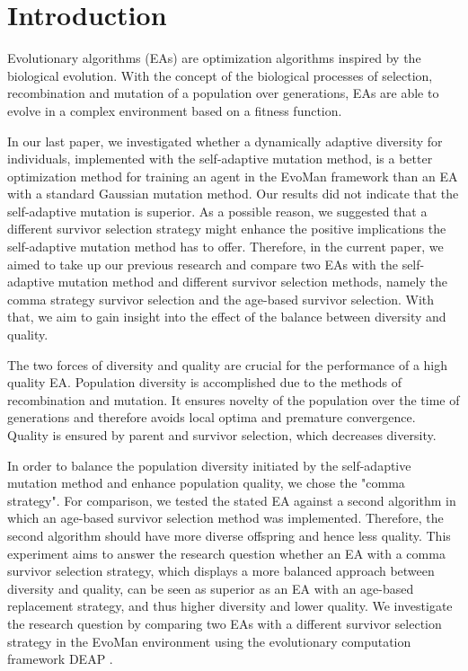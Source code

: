 \section{Introduction}

Evolutionary algorithms (EAs) are optimization algorithms inspired by the biological evolution. With the concept of the biological processes of selection, recombination and mutation of a population over generations, EAs are able to evolve in a complex environment based on a fitness function. 

In our last paper, we investigated whether a dynamically adaptive diversity for individuals, implemented with the self-adaptive mutation method, is a better optimization method for training an agent in the EvoMan framework \cite{defranca2020evoman} than an EA with a standard Gaussian mutation method. Our results did not indicate that the self-adaptive mutation is superior. As a possible reason, we suggested that a different survivor selection strategy might enhance the positive implications the self-adaptive mutation method has to offer. Therefore, in the current paper, we aimed to take up our previous research and compare two EAs with the self-adaptive mutation method and different survivor selection methods, namely the comma strategy survivor selection and the age-based survivor selection. With that, we aim to gain insight into the effect of the balance between diversity and quality.

The two forces of diversity and quality are crucial for the performance of a high quality EA. Population diversity is accomplished due to the methods of recombination and mutation. It ensures novelty of the population over the time of generations and therefore avoids local optima and premature convergence. Quality is ensured by parent and survivor selection, which decreases diversity. 

In order to balance the population diversity initiated by the self-adaptive mutation method and enhance population quality, we chose the "comma strategy"\cite{series/ncs/EibenS03}. For comparison, we tested the stated EA against a second algorithm in which an age-based survivor selection method was implemented. Therefore, the second algorithm should have more diverse offspring and hence less quality. This experiment aims to answer the research question whether an EA with a comma survivor selection strategy, which displays a more balanced approach between diversity and quality, can be seen as superior as an EA with an age-based replacement strategy, and thus higher diversity and lower quality. We investigate the research question by comparing two EAs with a different survivor selection strategy in the EvoMan environment \cite{defranca2020evoman} using the evolutionary computation framework DEAP \cite{DEAP_JMLR2012}.\par


